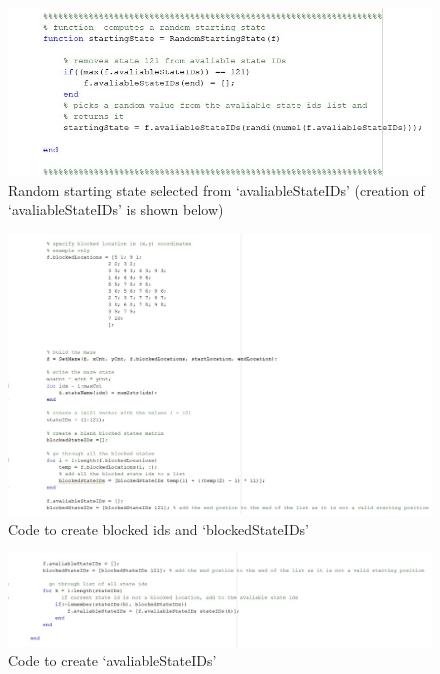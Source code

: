 \documentclass [11pt]{article}
\begin{document}
\begin{figure}[H]
\centerline{\includegraphics[width=15cm]{random_starting_state}}
\caption{Random starting state selected from ‘avaliableStateIDs’ (creation of ‘avaliableStateIDs’ is shown below)}
\label{fig:rand_starting_state}
\end{figure}

\begin{figure}[H]
\centerline{\includegraphics[width=15cm]{blocked_states}}
\caption{Code to create blocked ids and ‘blockedStateIDs’}
\label{fig:blocked_state_and_blocked_state_ids}
\end{figure}

\begin{figure}[H]
\centerline{\includegraphics[width=15cm]{blocked_states_and_avaliable_states}}
\caption{Code to create ‘avaliableStateIDs’ }
\label{fig:avaliable_state_ids}
\end{figure}
\end{document}
